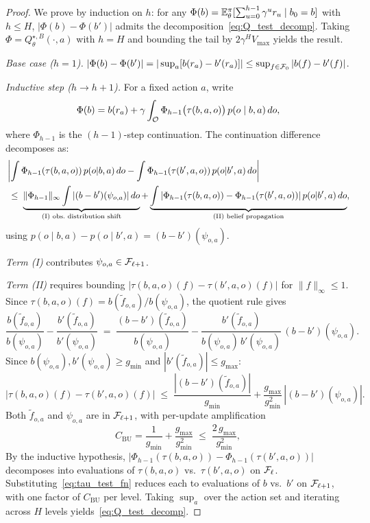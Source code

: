 \begin{proof}
We prove by induction on $h$: for any $\Phi(b)=\mathbb{E}_\theta^{\pi}[\sum_{u=0}^{h-1}\gamma^u r_u\mid b_0=b]$ with $h\le H$, $|\Phi(b)-\Phi(b')|$ admits the decomposition~\eqref{eq:Q_test_decomp}. Taking $\Phi=Q_\theta^{\star,B}(\cdot,a)$ with $h=H$ and bounding the tail by $2\gamma^H V_{\max}$ yields the result.

\emph{Base case ($h=1$).} $|\Phi(b)-\Phi(b')|=|\sup_a[b(r_a)-b'(r_a)]|\le\sup_{f\in{\mathcal{F}}_0}|b(f)-b'(f)|$.

\emph{Inductive step ($h\to h+1$).} For a fixed action $a$, write
\[
\Phi(b)=b(r_a)+\gamma\int_{{\mathcal{O}}}\Phi_{h-1}\bigl(\tau(b,a,o)\bigr)\,p(o\mid b,a)\,do,
\]
where $\Phi_{h-1}$ is the $(h-1)$-step continuation. The continuation difference decomposes as:
\begin{align}
&\left|\int\Phi_{h-1}(\tau(b,a,o))\,p(o|b,a)\,do-\int\Phi_{h-1}(\tau(b',a,o))\,p(o|b',a)\,do\right|\notag\\
&\;\le\;\underbrace{\|\Phi_{h-1}\|_\infty\int|(b-b')(\psi_{o,a})|\,do}_{\text{(I) obs.\ distribution shift}}+\underbrace{\int|\Phi_{h-1}(\tau(b,a,o))-\Phi_{h-1}(\tau(b',a,o))|\,p(o|b',a)\,do}_{\text{(II) belief propagation}},\label{eq:cont_split}
\end{align}
using $p(o\mid b,a)-p(o\mid b',a)=(b-b')(\psi_{o,a})$.

\emph{Term (I)} contributes $\psi_{o,a}\in{\mathcal{F}}_{\ell+1}$. 

\emph{Term (II)} requires bounding $|\tau(b,a,o)(f)-\tau(b',a,o)(f)|$ for $\|f\|_\infty\le 1$. Since $\tau(b,a,o)(f)=b(\tilde f_{o,a})/b(\psi_{o,a})$, the quotient rule gives
\begin{equation}\label{eq:quotient_rule}
\frac{b(\tilde f_{o,a})}{b(\psi_{o,a})}-\frac{b'(\tilde f_{o,a})}{b'(\psi_{o,a})}
\;=\;
\frac{(b-b')(\tilde f_{o,a})}{b(\psi_{o,a})}-\frac{b'(\tilde f_{o,a})}{b(\psi_{o,a})\,b'(\psi_{o,a})}\,(b-b')(\psi_{o,a}).
\end{equation}
Since $b(\psi_{o,a}),b'(\psi_{o,a})\ge g_{\min}$ and $|b'(\tilde f_{o,a})|\le g_{\max}$:
\begin{equation}\label{eq:tau_test_fn}
|\tau(b,a,o)(f)-\tau(b',a,o)(f)|
\;\le\;
\frac{|(b-b')(\tilde f_{o,a})|}{g_{\min}}+\frac{g_{\max}}{g_{\min}^2}\,|(b-b')(\psi_{o,a})|.
\end{equation}
Both $\tilde f_{o,a}$ and $\psi_{o,a}$ are in ${\mathcal{F}}_{\ell+1}$, with per-update amplification
\[
C_{\mathrm{BU}}=\frac{1}{g_{\min}}+\frac{g_{\max}}{g_{\min}^2}\;\le\;\frac{2\,g_{\max}}{g_{\min}^2},
\]
By the inductive hypothesis, $|\Phi_{h-1}(\tau(b,a,o))-\Phi_{h-1}(\tau(b',a,o))|$ decomposes into evaluations of $\tau(b,a,o)$ vs.\ $\tau(b',a,o)$ on ${\mathcal{F}}_\ell$. Substituting~\eqref{eq:tau_test_fn} reduces each to evaluations of $b$ vs.\ $b'$ on ${\mathcal{F}}_{\ell+1}$, with one factor of $C_{\mathrm{BU}}$ per level. Taking $\sup_a$ over the action set and iterating across $H$ levels yields~\eqref{eq:Q_test_decomp}.
\end{proof}

